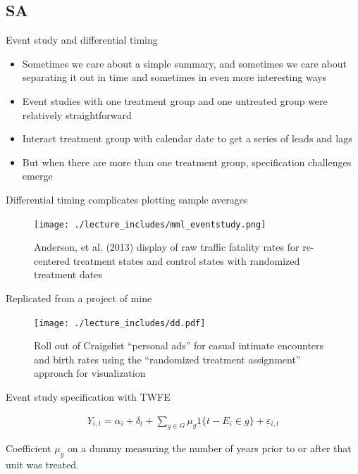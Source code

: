 \documentclass{beamer}
\begin{document}
\subsection{SA}

\begin{frame}{Event study and differential timing}

\begin{itemize}
\item Sometimes we care about a simple summary, and sometimes we care about separating it out in time and sometimes in even more interesting ways
\item Event studies with one treatment group and one untreated group were relatively straightforward
\item Interact treatment group with calendar date to get a series of leads and lags
\item But when there are more than one treatment group, specification challenges emerge
\end{itemize}

\end{frame}



\begin{frame}{Differential timing complicates plotting sample averages}

	\begin{figure}
	\texttt{[image: ./lecture\_includes/mml\_eventstudy.png]}
	\caption{Anderson, et al. (2013) display of raw traffic fatality rates for re-centered treatment states and control states with randomized treatment dates}
	\end{figure}

\end{frame}

\begin{frame}{Replicated from a project of mine}

	\begin{figure}
	\texttt{[image: ./lecture\_includes/dd.pdf]}
	\caption{Roll out of Craigslist ``personal ads'' for casual intimate encounters and birth rates using the ``randomized treatment assignment'' approach for visualization}
	\end{figure}

\end{frame}

\begin{frame}{Event study specification with TWFE}


\begin{eqnarray*}
Y_{i,t} = \alpha_i + \delta_t + \sum_{g \in G} \mu_g1\{t-E_i \in g \} + \varepsilon_{i,t}
\end{eqnarray*}

\bigskip

Coefficient $\mu_g$ on a dummy measuring the number of years prior to or after that unit was treated.  

\end{frame}
\end{document}

